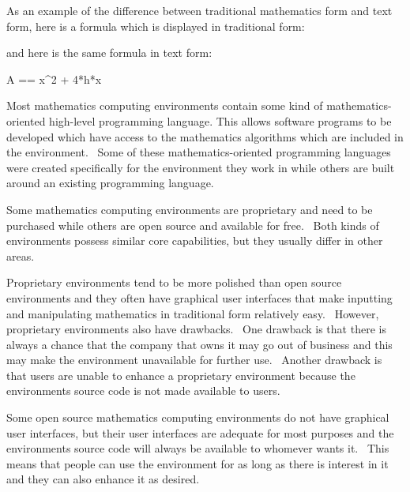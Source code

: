 \documentclass[12pt,twoside]{book}
\begin{document}
\bigskip

As an example of the difference between traditional mathematics form and text form, here is a formula which is displayed in traditional form: 

\bigskip


\bigskip


\bigskip

and here is the same formula in text form:


\bigskip

A == x\^{}2 + 4*h*x


\bigskip

Most mathematics computing environments contain some kind of mathematics{}-oriented high{}-level programming language. This allows software programs to be developed which have access to the mathematics algorithms which are included in the environment. \ Some of these mathematics{}-oriented programming languages were created specifically for the environment they work in while others are built around an existing programming language. 

\bigskip

Some mathematics computing environments are proprietary and need to be purchased while others are open source and available for free. \ Both kinds of environments possess similar core capabilities, but they usually differ in other areas. 

\bigskip

Proprietary environments tend to be more polished than open source environments and they often have graphical user interfaces that make inputting and manipulating mathematics in traditional form relatively easy. \ However, proprietary environments also have drawbacks. \ One drawback is that there is always a chance that the company that owns it may go out of business and this may make the environment unavailable for further use. \ Another drawback is that users are unable to enhance a proprietary environment because the environment{\textquotesingle}s source code is not made available to users. 

\bigskip

Some open source mathematics computing environments do not have graphical user interfaces, but their user interfaces are adequate for most purposes and the environment{\textquotesingle}s source code will always be available to whomever wants it. \ This means that people can use the environment for as long as there is interest in it and they can also enhance it as desired.
\end{document}
